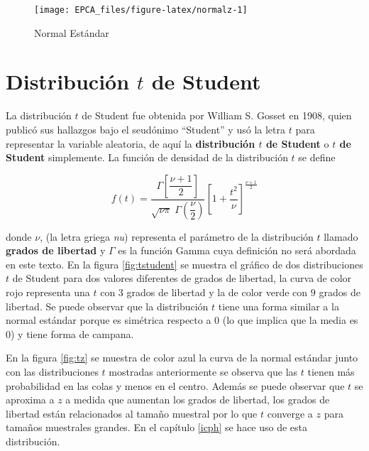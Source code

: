\documentclass[letterpaper,]{book}
\begin{document}
\begin{figure}[h!]

{\centering \texttt{[image: EPCA\_files/figure-latex/normalz-1]} 

}

\caption{Normal Estándar}\label{fig:normalz}
\end{figure}

\hypertarget{distribucion-t-de-student}{%
\section{\texorpdfstring{Distribución \(t\) de Student}{Distribución t de Student}}\label{distribucion-t-de-student}}

La distribución \(t\) de Student fue obtenida por William S. Gosset en 1908, quien publicó sus hallazgos bajo el seudónimo ``Student'' y usó la letra \(t\) para representar la variable aleatoria, de aquí la \textbf{distribución \(t\) de Student} o \textbf{\(t\) de Student} simplemente. La función de densidad de la distribución \(t\) se define

\begin{equation}
f\left(t\right)=\dfrac{\Gamma\left[\dfrac{\nu+1}{2}\right]}{\sqrt{\nu \pi} \; \Gamma\left(\dfrac{\nu}{2}\right)}\left[1 + \dfrac{t^2}{\nu} \right]^{\frac{\nu+1}{2}}
\label{eq:studentpdf}
\end{equation}

donde \(\nu\), (la letra griega \emph{nu}) representa el parámetro de la distribución \(t\) llamado \textbf{grados de libertad} y \(\Gamma\) es la función Gamma cuya definición no será abordada en este texto.
En la figura \ref{fig:tstudent} se muestra el gráfico de dos distribuciones \(t\) de Student para dos valores diferentes de grados de libertad, la curva de color rojo representa una \(t\) con 3 grados de libertad y la de color verde con \(9\) grados de libertad. Se puede observar que la distribución \(t\) tiene una forma similar a la normal estándar porque es simétrica respecto a \(0\) (lo que implica que la media es \(0\)) y tiene forma de campana.

En la figura \ref{fig:tz} se muestra de color azul la curva de la normal estándar junto con las distribuciones \(t\) mostradas anteriormente se observa que las \(t\) tienen más probabilidad en las colas y menos en el centro. Además se puede observar que \(t\) se aproxima a \(z\) a medida que aumentan los grados de libertad, los grados de libertad están relacionados al tamaño muestral por lo que \(t\) converge a \(z\) para tamaños muestrales grandes. En el capítulo \ref{icph} se hace uso de esta distribución.
\end{document}
